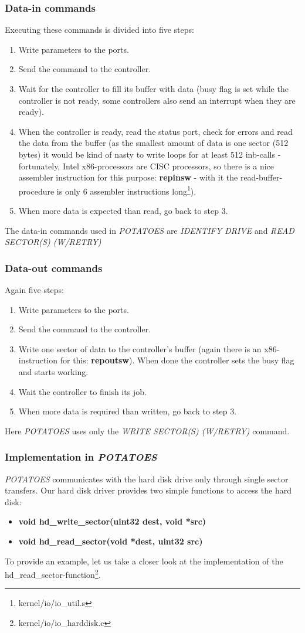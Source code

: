 \documentclass[11pt,a4paper]{scrartcl}
\begin{document}
\subsubsection{Data-in commands}
Executing these commands is divided into five steps:
\begin{enumerate}
\item Write parameters to the ports.
\item Send the command to the controller.
\item Wait for the controller to fill its buffer with data (busy flag is set while the controller is not ready, some controllers also send an interrupt when they are ready).
\item When the controller is ready, read the status port, check for errors and read the data from the buffer (as the smallest amount of data is one sector (512 bytes) it would be kind of nasty to write loops for at least 512 inb-calls - fortunately, Intel x86-processors are CISC processors, so there is a nice assembler instruction for this purpose: \textbf{repinsw} - with it the read-buffer-procedure is only 6 assembler instructions long\footnote{kernel/io/io\_util.s}).
\item When more data is expected than read, go back to step 3.
\end{enumerate}
The data-in commands used in \textit{POTATOES} are \textit{IDENTIFY DRIVE} and \textit{READ SECTOR(S) (W/RETRY)}
\subsubsection{Data-out commands}
Again five steps:
\begin{enumerate}
\item Write parameters to the ports.
\item Send the command to the controller.
\item Write one sector of data to the controller's buffer (again there is an x86-instruction for this: \textbf{repoutsw}). When done the controller sets the busy flag and starts working.
\item Wait the controller to finish its job.
\item When more data is required than written, go back to step 3.
\end{enumerate}
Here \textit{POTATOES} uses only the \textit{WRITE SECTOR(S) (W/RETRY)} command.
\subsubsection{Implementation in \textit{POTATOES}}
\textit{POTATOES} communicates with the hard disk drive only through single sector transfers. Our hard disk driver provides two simple functions to access the hard disk:
\begin{itemize}
\item \textbf{void hd\_write\_sector(uint32 dest, void *src)}
\item \textbf{void hd\_read\_sector(void *dest, uint32 src)}
\end{itemize}
To provide an example, let us take a closer look at the implementation of the hd\_read\_sector-function\footnote{kernel/io/io\_harddisk.c}.
\end{document}
